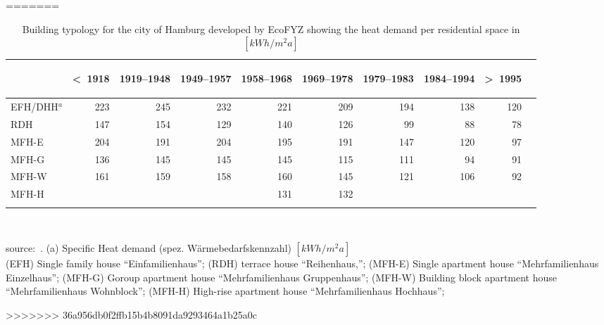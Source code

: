 =======
\begin{table}[htbp]
  \centering
  \caption{Building typology for the city of Hamburg developed by EcoFYZ
      showing the heat demand per residential space in
  $[kWh/m^2a]$}\label{tab:EcoFYZ}%
  \begin{tabular}{l r rrr rrr rr}
    \addlinespace
    \toprule
    &
    \begin{sideways}\textless~1918\end{sideways}&  %
    \begin{sideways}1919--1948\end{sideways}&     %
    \begin{sideways}1949--1957\end{sideways}&     %
    \begin{sideways}1958--1968\end{sideways}&     %
    \begin{sideways}1969--1978\end{sideways}&     %
    \begin{sideways}1979--1983\end{sideways}&     %
    \begin{sideways}1984--1994\end{sideways}&     %
    \begin{sideways}\textgreater~1995\end{sideways}\\    %
    \midrule
EFH/DHH$^a$  &223 & 245 & 232& 221& 209& 194& 138& 120\\
RDH          &147 & 154 & 129& 140& 126& 99 & 88 & 78\\
MFH-E        &204 & 191 & 204& 195& 191& 147& 120& 97\\
MFH-G        &136 & 145 & 145& 145& 115& 111& 94 & 91\\
MFH-W  	  &161 & 159 & 158& 160& 145& 121& 106& 92\\
MFH-H        &    &     &    & 131& 132\\
    \bottomrule
    \addlinespace
    \end{tabular}\\
    \begin{footnotesize}
        source:~\cite[pp.~18]{Hermelink.2011}.
    (a) Specific Heat demand (spez. W\"armebedarfskennzahl)
    $[kWh/m^{2}a]$\\
(EFH) Single family house ``Einfamilienhaus'';
(RDH) terrace house ``Reihenhaus,'';
(MFH-E) Single apartment house ``Mehrfamilienhaus Einzelhaus'';
(MFH-G) Goroup apartment house ``Mehrfamilienhaus Gruppenhaus'';
(MFH-W) Building block apartment house ``Mehrfamilienhaus Wohnblock'';
(MFH-H) High-rise apartment house ``Mehrfamilienhaus Hochhaus'';
    \end{footnotesize}
\end{table}
>>>>>>> 36a956db0f2ffb15b4b8091da9293464a1b25a0c